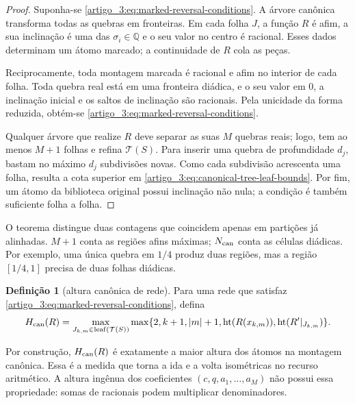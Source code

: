 \documentclass[12pt,a4paper]{article}
\theoremstyle{preciso}
\theoremstyle{definition}
\newcommand{\height}{\operatorname{ht}}
\theoremstyle{preciso}
\theoremstyle{preciso}
\theoremstyle{preciso}
\theoremstyle{preciso}
\theoremstyle{definition}
\newtheorem{definition}[teorema]{Definição}
\theoremstyle{preciso}
\theoremstyle{definition}
\theoremstyle{preciso}
\theoremstyle{preciso}
\theoremstyle{definition}
\begin{document}
\begin{proof}
Suponha-se \eqref{artigo_3:eq:marked-reversal-conditions}. A árvore canônica transforma
todas as quebras em fronteiras. Em cada folha $J$, a função $R$ é afim, a sua
inclinação é uma das $\sigma_i\in\mathbb Q$ e o seu valor no centro é racional.
Esses dados determinam um átomo marcado; a continuidade de $R$ cola as peças.

Reciprocamente, toda montagem marcada é racional e afim no interior de cada
folha. Toda quebra real está em uma fronteira diádica, e o seu valor em $0$, a
inclinação inicial e os saltos de inclinação são racionais. Pela unicidade da
forma reduzida, obtém-se \eqref{artigo_3:eq:marked-reversal-conditions}.

Qualquer árvore que realize $R$ deve separar as suas $M$ quebras reais; logo, tem
ao menos $M+1$ folhas e refina $\mathcal T(S)$. Para inserir uma quebra de
profundidade $d_j$, bastam no máximo $d_j$ subdivisões novas. Como cada
subdivisão acrescenta uma folha, resulta a cota superior em
\eqref{artigo_3:eq:canonical-tree-leaf-bounds}. Por fim, um átomo da biblioteca
original possui inclinação não nula; a condição é também suficiente folha a
folha.
\end{proof}

O teorema distingue duas contagens que coincidem apenas em partições já
alinhadas. $M+1$ conta as regiões afins máximas; $N_{\rm can}$ conta as células
diádicas. Por exemplo, uma única quebra em $1/4$ produz duas regiões, mas a
região $[1/4,1]$ precisa de duas folhas diádicas.

\begin{definition}[altura canônica de rede]\label{map:artigo_3:5.3}
\label{artigo_3:def:canonical-network-height}
Para uma rede que satisfaz \eqref{artigo_3:eq:marked-reversal-conditions}, defina
\begin{equation}
 H_{\rm can}(R)=
 \max_{J_{k,m}\in\operatorname{leaf}(\mathcal T(S))}
 \max\{2,k+1,|m|+1,\height(R(x_{k,m})),\height(R'|_{J_{k,m}})\}.
 \label{artigo_3:eq:canonical-network-height}
\end{equation}
\end{definition}

Por construção, $H_{\rm can}(R)$ é exatamente a maior altura dos átomos na
montagem canônica. Essa é a medida que torna a ida e a volta isométricas no
recurso aritmético. A altura ingênua dos coeficientes
$(c,q,a_1,\ldots,a_M)$ não possui essa propriedade: somas de racionais podem
multiplicar denominadores.
\end{document}
